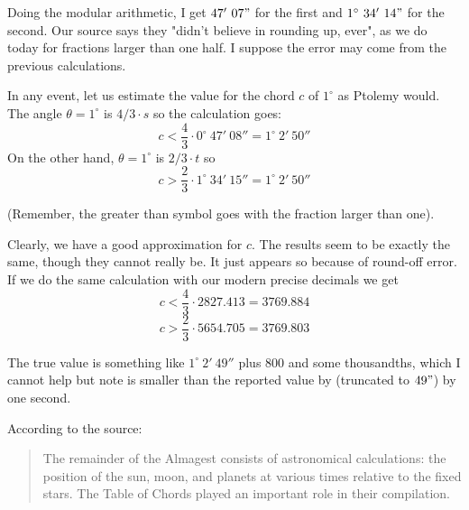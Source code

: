 \documentclass[11pt, oneside]{article}
\begin{document}
Doing the modular arithmetic, I get $47' \ 07"$ for the first and $1^{\circ} \ 34' \ 14"$ for the second.  Our source says they "didn't believe in rounding up, ever", as we do today for fractions larger than one half.  I suppose the error may come from the previous calculations.

In any event, let us estimate the value for the chord $c$ of $1^{\circ}$ as Ptolemy would.  The angle $\theta = 1^{\circ}$ is $4/3 \cdot s$ so the calculation goes:
\[ c < \frac{4}{3} \cdot 0^{\circ}\ 47'\ 08'' = 1^{\circ}\ 2'\ 50'' \]
On the other hand, $\theta = 1^{\circ}$ is $2/3 \cdot t$ so 
\[ c > \frac{2}{3} \cdot 1^{\circ}\ 34'\ 15'' = 1^{\circ}\ 2'\ 50'' \]

(Remember, the greater than symbol goes with the fraction larger than one).

Clearly, we have a good approximation for $c$.  The results seem to be exactly the same, though they cannot really be.  It just appears so because of round-off error.  If we do the same calculation with our modern precise decimals we get
\[ c < \frac{4}{3} \cdot 2827.413 = 3769.884 \]
\[ c > \frac{2}{3} \cdot 5654.705 = 3769.803 \]

The true value is something like $1^{\circ}\ 2'\ 49''$ plus $800$ and some thousandths, which I cannot help but note is smaller than the reported value by (truncated to $49"$) by one second.

According to the source:

\begin{quote}The remainder of the Almagest consists of astronomical calculations: the position of the sun, moon, and planets at various times relative to the fixed stars. The Table of Chords played an important role in their compilation.\end{quote}
\end{document}
